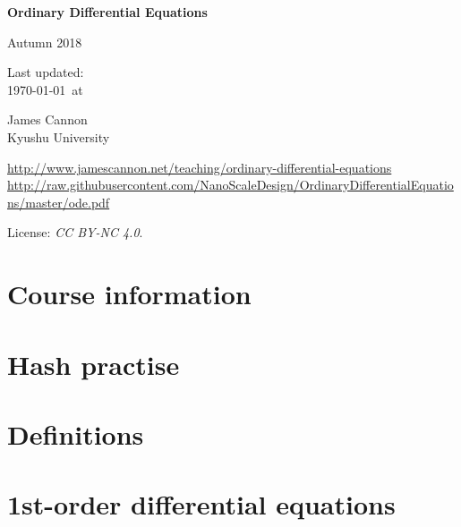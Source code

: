 \documentclass[a4paper]{book} %
\newcommand{\courseyear}{2018 }
\newcommand{\courseurl}{ordinary-differential-equations}
\begin{document}
\begin{titlepage}
    \begin{center}
        \vspace*{1cm}

        \Huge
        \textbf{Ordinary Differential Equations}

        Autumn \courseyear

        \vspace{1.5cm}
        \Large
        Last updated:\\\today \ at \currenttime

        \vspace{4.0cm}
        \LARGE
        James Cannon\\Kyushu University
        \vfill

        \normalsize
        \url{http://www.jamescannon.net/teaching/\courseurl}\\
        \vspace{0.3cm}
        \small
        \url{http://raw.githubusercontent.com/NanoScaleDesign/OrdinaryDifferentialEquations/master/ode.pdf}
        \vspace{0.5cm}

        License: \emph{CC BY-NC 4.0}.

    \end{center}
\end{titlepage}

\setcounter{chapter}{-1}

\tableofcontents

\chapter{Course information}
\newpage



%


\chapter{Hash practise}

\chapter{Definitions}

\chapter{1st-order differential equations}

\end{document}
